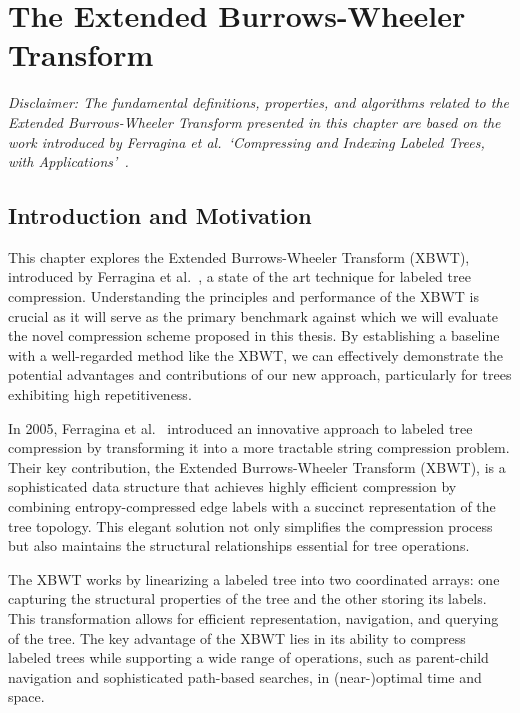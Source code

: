 \chapter[The Extended Burrows-Wheeler Transform]{The Extended Burrows-Wheeler \\ Transform} \label{chp:tree_compression}
\textit{Disclaimer: The fundamental definitions, properties, and algorithms related to the Extended Burrows-Wheeler Transform presented in this chapter are based on the work introduced by Ferragina et al.~`Compressing and Indexing Labeled Trees, with Applications'~\cite{ferragina2009compressing}.}

\section{Introduction and Motivation}
This chapter explores the Extended Burrows-Wheeler Transform (XBWT), introduced by Ferragina et al.~\cite{ferragina2009compressing}, a state of the art technique for labeled tree compression. Understanding the principles and performance of the XBWT is crucial as it will serve as the primary benchmark against which we will evaluate the novel compression scheme proposed in this thesis. By establishing a baseline with a well-regarded method like the XBWT, we can effectively demonstrate the potential advantages and contributions of our new approach, particularly for trees exhibiting high repetitiveness.

In 2005, Ferragina et al.~\cite{ferragina2009compressing} introduced an innovative approach to labeled tree compression by transforming it into a more tractable string compression problem. Their key contribution, the Extended Burrows-Wheeler Transform (XBWT), is a sophisticated data structure that achieves highly efficient compression by combining entropy-compressed edge labels with a succinct representation of the tree topology. This elegant solution not only simplifies the compression process but also maintains the structural relationships essential for tree operations.

The XBWT works by linearizing a labeled tree into two coordinated arrays: one capturing the structural properties of the tree and the other storing its labels. This transformation allows for efficient representation, navigation, and querying of the tree. The key advantage of the XBWT lies in its ability to compress labeled trees while supporting a wide range of operations, such as parent-child navigation and sophisticated path-based searches, in (near-)optimal time and space.

